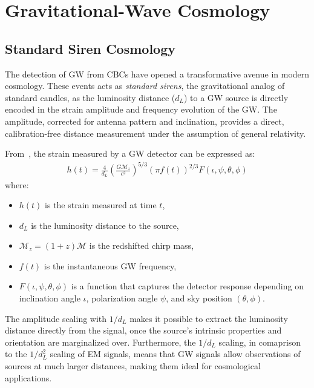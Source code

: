 \chapter{Gravitational-Wave Cosmology}
\label{chap:dark-siren-cosmology}

\section{Standard Siren Cosmology}

The detection of \ac{GW} from \acp{CBC} have opened a transformative avenue in modern cosmology. These events acts as \textit{standard sirens}, the gravitational analog of standard candles, as the luminosity distance ($d_L$) to a \ac{GW} source is directly encoded in the strain amplitude and frequency evolution of the \ac{GW}. The amplitude, corrected for antenna pattern and inclination, provides a direct, calibration-free distance measurement under the assumption of general relativity.

From~\citet{maggiore2007gravitational}, the strain measured by a GW detector can be expressed as:
\begin{align}
h(t) = \frac{4}{d_L} \left( \frac{G\mathcal{M}_z}{c^2} \right)^{5/3}
       \left( \pi f(t) \right)^{2/3} F(\iota, \psi, \theta, \phi)
\label{eq:gw_strain}
\end{align}
where:
\vspace{-1em}
\begin{itemize}
    \item $h(t)$ is the strain measured at time $t$,
    \vspace{-1em}
    \item $d_L$ is the luminosity distance to the source,
    \vspace{-1em}
    \item $\mathcal{M}_z = (1+z)\mathcal{M}$ is the redshifted chirp mass,
    \vspace{-1em}
    \item $f(t)$ is the instantaneous GW frequency,
    \vspace{-1em}
    \item $F(\iota, \psi, \theta, \phi)$ is a function that captures the detector response depending on inclination angle $\iota$, polarization angle $\psi$, and sky position $(\theta, \phi)$.
\end{itemize}

The amplitude scaling with $1/d_L$ makes it possible to extract the luminosity distance directly from the signal, once the source's intrinsic properties and orientation are marginalized over. Furthermore, the $1/d_L$ scaling, in comaprison to the $1/d_L^2$ scaling of \ac{EM} signals, means that \ac{GW} signals allow observations of sources at much larger distances, making them ideal for cosmological applications.

